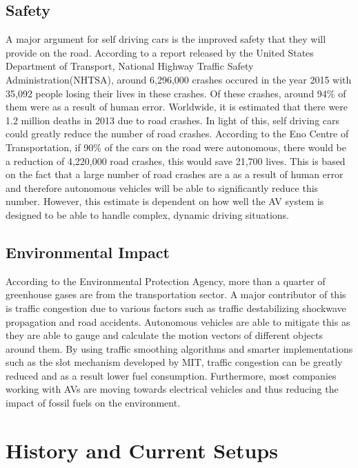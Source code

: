 \subsection{Safety}
A major argument for self driving cars is the improved safety that they will provide on the road. According to a report released by the United States Department of Transport, National Highway Traffic Safety Administration(NHTSA), around 6,296,000 crashes occured in the year 2015 with 35,092 people losing their lives in these crashes. Of these crashes, around 94\% of them were as a result of human error. Worldwide, it is estimated that there were 1.2 million deaths in 2013 due to road crashes. 
In light of this, self driving cars could greatly reduce the number of road crashes. According to the Eno Centre of Transportation, if 90\% of the cars on the road were autonomous, there would be a reduction of 4,220,000 road crashes, this would save 21,700 lives. This is based on the fact that a large number of road crashes are a as a result of human error and therefore autonomous vehicles will be able to significantly reduce this number. 
However, this estimate is dependent on how well the AV system is designed to be able to handle complex, dynamic driving situations. 

\subsection{Environmental Impact}

According to the Environmental Protection Agency, more than a  quarter of greenhouse gases are from the transportation sector. A major contributor of this is traffic congestion due to various factors such as traffic destabilizing shockwave propagation and road accidents. Autonomous vehicles are able to mitigate this as they are able to gauge and calculate the motion vectors of different objects around them. By using traffic smoothing algorithms and smarter implementations such as the slot mechanism developed by MIT, traffic congestion can be greatly reduced and as a result lower fuel consumption. Furthermore, most companies working with AVs are moving towards electrical vehicles and thus reducing the impact of fossil fuels on the environment. 




\section{History and Current Setups}

